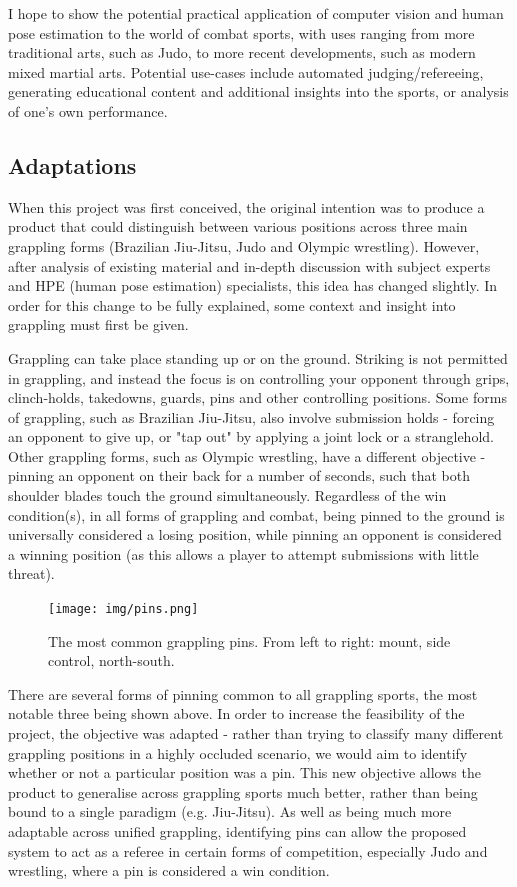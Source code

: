 \documentclass[a4paper, oneside, 11pt]{article}
\begin{document}
\bigskip
\noindent
I hope to show the potential practical application of computer vision and human pose estimation to the world of combat sports, with uses ranging from more traditional arts, such as Judo, to more recent developments, such as modern mixed martial arts. Potential use-cases include automated judging/refereeing, generating educational content and additional insights into the sports, or analysis of one's own performance.

\bigskip
\noindent

\subsection{Adaptations}

When this project was first conceived, the original intention was to produce a product that could distinguish between various positions across three main grappling forms (Brazilian Jiu-Jitsu, Judo and Olympic wrestling). However, after analysis of existing material and in-depth discussion with subject experts and HPE (human pose estimation) specialists, this idea has changed slightly. In order for this change to be fully explained, some context and insight into grappling must first be given.

\bigskip
\noindent
Grappling can take place standing up or on the ground. Striking is not permitted in grappling, and instead the focus is on controlling your opponent through grips, clinch-holds, takedowns, guards, pins and other controlling positions. Some forms of grappling, such as Brazilian Jiu-Jitsu, also involve submission holds - forcing an opponent to give up, or "tap out" by applying a joint lock or a stranglehold. Other grappling forms, such as Olympic wrestling, have a different objective - pinning an opponent on their back for a number of seconds, such that both shoulder blades touch the ground simultaneously. Regardless of the win condition(s), in all forms of grappling and combat, being pinned to the ground is universally considered a losing position, while pinning an opponent is considered a winning position (as this allows a player to attempt submissions with little threat).

\bigskip
\begin{figure}[h]
    \centering
    \texttt{[image: img/pins.png]}
    \caption{The most common grappling pins. From left to right: mount, side control, north-south.}
    \label{fig:grapplingpins}
\end{figure}

\bigskip
\noindent
There are several forms of pinning common to all grappling sports, the most notable three being shown above. In order to increase the feasibility of the project, the objective was adapted - rather than trying to classify many different grappling positions in a highly occluded scenario, we would aim to identify whether or not a particular position was a pin. This new objective allows the product to generalise across grappling sports much better, rather than being bound to a single paradigm (e.g. Jiu-Jitsu). As well as being much more adaptable across unified grappling, identifying pins can allow the proposed system to act as a referee in certain forms of competition, especially Judo and wrestling, where a pin is considered a win condition.
\end{document}
